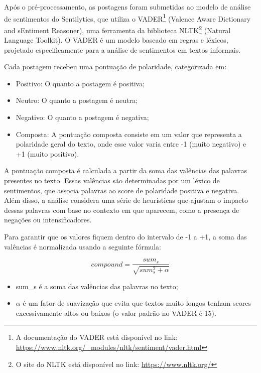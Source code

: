\documentclass[
	12pt,				%
	oneside,			%
	a4paper,			%
	english,			%
	french,				%
	spanish,			%
	brazil				%
	]{abntex2}
\begin{document}
Após o pré-processamento, as postagens foram submetidas ao modelo de
análise de sentimentos do Sentilytics, que utiliza o VADER\footnote{A
  documentação do VADER está disponível no link:
  \url{https://www.nltk.org/_modules/nltk/sentiment/vader.html}}
(Valence Aware Dictionary and sEntiment Reasoner), uma ferramenta da
biblioteca NLTK\footnote{O site do NLTK está disponível no link:
  \url{https://www.nltk.org/}} (Natural Language Toolkit). O VADER é um
modelo baseado em regras e léxicos, projetado especificamente para a
análise de sentimentos em textos informais.

Cada postagem recebeu uma pontuação de polaridade, categorizada em:

\begin{itemize}
\tightlist
\item
  Positivo: O quanto a postagem é positiva;
\item
  Neutro: O quanto a postagem é neutra;
\item
  Negativo: O quanto a postagem é negativa;
\item
  Composta: A pontuação composta consiste em um valor que representa a
  polaridade geral do texto, onde esse valor varia entre -1 (muito
  negativo) e +1 (muito positivo).
\end{itemize}

A pontuação composta é calculada a partir da soma das valências das
palavras presentes no texto. Essas valências são determinadas por um
léxico de sentimentos, que associa palavras ao score de polaridade
positiva e negativa. Além disso, a análise considera uma série de
heurísticas que ajustam o impacto dessas palavras com base no contexto
em que aparecem, como a presença de negações ou intensificadores.

Para garantir que os valores fiquem dentro do intervalo de -1 a +1, a
soma das valências é normalizada usando a seguinte fórmula:

\begin{equation}
    compound = \frac{sum_s}{\sqrt{sum_s^2 + \alpha}}
\end{equation}

\begin{itemize}
\tightlist
\item
  sum\_s é a soma das valências das palavras no texto;
\item
  \(\alpha\) é um fator de suavização que evita que textos muito longos
  tenham scores excessivamente altos ou baixos (o valor padrão no VADER
  é 15).
\end{itemize}
\end{document}
